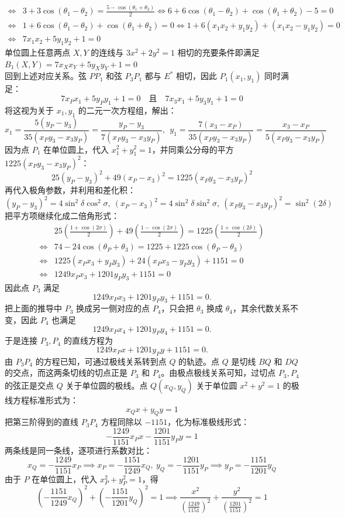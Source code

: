 \begin{solution}
\begin{align*}
\Leftrightarrow & 3 + 3\cos(\theta_1 - \theta_2) = \frac{5 - \cos(\theta_1 + \theta_2)}{2}\Leftrightarrow 6 + 6\cos(\theta_1 - \theta_2) + \cos(\theta_1 + \theta_2) - 5 = 0\\
\Leftrightarrow & 1 + 6\cos(\theta_1 - \theta_2) + \cos(\theta_1 + \theta_2) = 0\Leftrightarrow 1 + 6(x_1 x_2 + y_1 y_2) + (x_1 x_2 - y_1 y_2) = 0\\
\Leftrightarrow & 7x_1 x_2 + 5y_1 y_2 + 1 = 0
\end{align*}
单位圆上任意两点 $X, Y$ 的连线与 $3x^2 + 2y^2 = 1$ 相切的充要条件即满足 $B_1(X, Y) = 7x_X x_Y + 5y_X y_Y + 1 = 0$\\
回到上述对应关系。弦 $P P_1$ 和弦 $P_3 P_1$ 都与 $E^*$ 相切，因此 $P_1(x_1, y_1)$ 同时满足：
$$7x_P x_1 + 5y_P y_1 + 1 = 0 \quad \text{且} \quad 7x_3 x_1 + 5y_3 y_1 + 1 = 0$$
将这视为关于 $x_1, y_1$ 的二元一次方程组，解出：
$$x_1 = \frac{5(y_P - y_3)}{35(x_P y_3 - x_3 y_P)} = \frac{y_P - y_3}{7(x_P y_3 - x_3 y_P)},~~y_1 = \frac{7(x_3 - x_P)}{35(x_P y_3 - x_3 y_P)} = \frac{x_3 - x_P}{5(x_P y_3 - x_3 y_P)}$$
因为点 $P_1$ 在单位圆上，代入 $x_1^2 + y_1^2 = 1$，并同乘公分母的平方 $1225(x_P y_3 - x_3 y_P)^2$：
$$25(y_P - y_3)^2 + 49(x_P - x_3)^2 = 1225(x_P y_3 - x_3 y_P)^2$$
再代入极角参数，并利用和差化积：
\[(y_P - y_3)^2 = 4\sin^2\delta \cos^2\sigma,~(x_P - x_3)^2 = 4\sin^2\delta \sin^2\sigma,~(x_P y_3 - x_3 y_P)^2 = \sin^2(2\delta)\]
把平方项继续化成二倍角形式：
\begin{align*}
& 25 \left( \frac{1 + \cos(2\sigma)}{2} \right) + 49 \left( \frac{1 - \cos(2\sigma)}{2} \right) = 1225 \left( \frac{1 + \cos(2\delta)}{2} \right)\\
\Leftrightarrow & 74 - 24\cos(\theta_P + \theta_3) = 1225 + 1225\cos(\theta_P - \theta_3)\\
\Leftrightarrow & 1225(x_P x_3 + y_P y_3) + 24(x_P x_3 - y_P y_3) + 1151 = 0\\
\Leftrightarrow & 1249 x_P x_3 + 1201 y_P y_3 + 1151 = 0
\end{align*}
因此点 $P_3$ 满足
$$1249 x_P x_3 + 1201 y_P y_3 + 1151 = 0.$$
把上面的推导中 $P_3$ 换成另一侧对应的点 $P_4$，只会把 $\theta_3$ 换成 $\theta_4$，其余代数关系不变，因此 $P_4$ 也满足
$$1249 x_P x_4 + 1201 y_P y_4 + 1151 = 0.$$
于是连接 $P_3,P_4$ 的直线方程为
$$1249 x_P x + 1201 y_P y + 1151 = 0.$$
由 $P_3P_4$ 的方程已知，可通过极线关系转到点 $Q$ 的轨迹。点 $Q$ 是切线 $BQ$ 和 $DQ$ 的交点，而这两条切线的切点正是 $P_3$ 和 $P_4$。由极点极线关系可知，过切点 $P_3, P_4$ 的弦正是交点 $Q$ 关于单位圆的极线。点 $Q(x_Q, y_Q)$ 关于单位圆 $x^2 + y^2 = 1$ 的极线方程标准形式为：$$x_Q x + y_Q y = 1$$
把第三阶得到的直线 $P_3 P_4$ 方程同除以 $-1151$，化为标准极线形式：
$$-\frac{1249}{1151} x_P x - \frac{1201}{1151} y_P y = 1$$
两条线是同一条线，逐项进行系数对比：
$$x_Q = -\frac{1249}{1151} x_P \implies x_P = -\frac{1151}{1249} x_Q,~y_Q = -\frac{1201}{1151} y_P \implies y_P = -\frac{1151}{1201} y_Q$$
由于 $P$ 在单位圆上，代入 $x_P^2 + y_P^2 = 1$，得
$$\left( -\frac{1151}{1249} x_Q \right)^2 + \left( -\frac{1151}{1201} y_Q \right)^2 = 1\implies\frac{x^2}{\left(\frac{1249}{1151}\right)^2} + \frac{y^2}{\left(\frac{1201}{1151}\right)^2} = 1$$
\end{solution}

